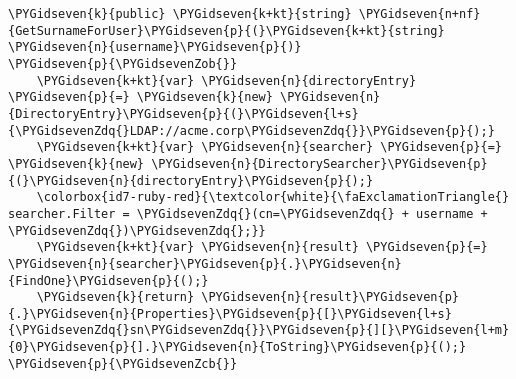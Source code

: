 \begin{mdframed}[backgroundcolor=lightgrey]
\begin{Verbatim}[commandchars=\\\{\}]
\PYGidseven{k}{public} \PYGidseven{k+kt}{string} \PYGidseven{n+nf}{GetSurnameForUser}\PYGidseven{p}{(}\PYGidseven{k+kt}{string} \PYGidseven{n}{username}\PYGidseven{p}{)}
\PYGidseven{p}{\PYGidsevenZob{}}
    \PYGidseven{k+kt}{var} \PYGidseven{n}{directoryEntry} \PYGidseven{p}{=} \PYGidseven{k}{new} \PYGidseven{n}{DirectoryEntry}\PYGidseven{p}{(}\PYGidseven{l+s}{\PYGidsevenZdq{}LDAP://acme.corp\PYGidsevenZdq{}}\PYGidseven{p}{);}
    \PYGidseven{k+kt}{var} \PYGidseven{n}{searcher} \PYGidseven{p}{=} \PYGidseven{k}{new} \PYGidseven{n}{DirectorySearcher}\PYGidseven{p}{(}\PYGidseven{n}{directoryEntry}\PYGidseven{p}{);}
    \colorbox{id7-ruby-red}{\textcolor{white}{\faExclamationTriangle{} searcher.Filter = \PYGidsevenZdq{}(cn=\PYGidsevenZdq{} + username + \PYGidsevenZdq{})\PYGidsevenZdq{};}}
    \PYGidseven{k+kt}{var} \PYGidseven{n}{result} \PYGidseven{p}{=} \PYGidseven{n}{searcher}\PYGidseven{p}{.}\PYGidseven{n}{FindOne}\PYGidseven{p}{();}
    \PYGidseven{k}{return} \PYGidseven{n}{result}\PYGidseven{p}{.}\PYGidseven{n}{Properties}\PYGidseven{p}{[}\PYGidseven{l+s}{\PYGidsevenZdq{}sn\PYGidsevenZdq{}}\PYGidseven{p}{][}\PYGidseven{l+m}{0}\PYGidseven{p}{].}\PYGidseven{n}{ToString}\PYGidseven{p}{();}
\PYGidseven{p}{\PYGidsevenZcb{}}
\end{Verbatim}
\end{mdframed}